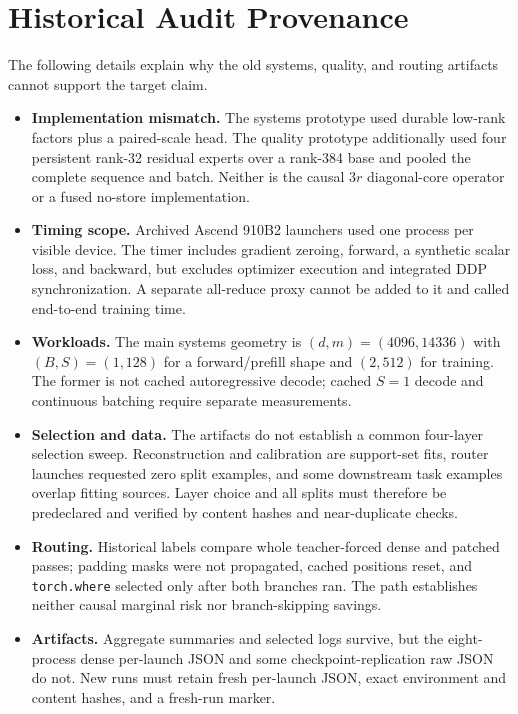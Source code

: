 \appendix
\section{Historical Audit Provenance}
\label{app:audit-provenance}

The following details explain why the old systems, quality, and routing
artifacts cannot support the target claim.
\begin{itemize}
  \item \textbf{Implementation mismatch.}  The systems prototype used durable
  low-rank factors plus a paired-scale head.  The quality prototype additionally
  used four persistent rank-32 residual experts over a rank-384 base and pooled
  the complete sequence and batch.  Neither is the causal $3r$ diagonal-core
  operator or a fused no-store implementation.
  \item \textbf{Timing scope.}  Archived Ascend 910B2 launchers used one process
  per visible device.  The timer includes gradient zeroing, forward, a synthetic
  scalar loss, and backward, but excludes optimizer execution and integrated
  DDP synchronization.  A separate all-reduce proxy cannot be added to it and
  called end-to-end training time.
  \item \textbf{Workloads.}  The main systems geometry is
  $(d,m)=(4096,14336)$ with $(B,S)=(1,128)$ for a forward/prefill shape and
  $(2,512)$ for training.  The former is not cached autoregressive decode;
  cached $S=1$ decode and continuous batching require separate measurements.
  \item \textbf{Selection and data.}  The artifacts do not establish a common
  four-layer selection sweep.  Reconstruction and calibration are support-set
  fits, router launches requested zero split examples, and some downstream task
  examples overlap fitting sources.  Layer choice and all splits must therefore
  be predeclared and verified by content hashes and near-duplicate checks.
  \item \textbf{Routing.}  Historical labels compare whole teacher-forced
  dense and patched passes; padding masks were not propagated, cached positions
  reset, and \texttt{torch.where} selected only after both branches ran.  The
  path establishes neither causal marginal risk nor branch-skipping savings.
  \item \textbf{Artifacts.}  Aggregate summaries and selected logs survive,
  but the eight-process dense per-launch JSON and some checkpoint-replication raw JSON
  do not.  New runs must retain fresh per-launch JSON, exact environment and
  content hashes, and a fresh-run marker.
\end{itemize}

